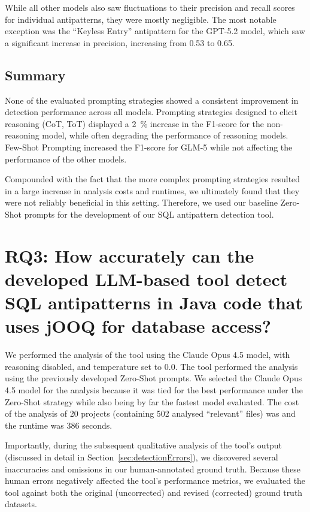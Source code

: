 While all other models also saw fluctuations to their precision and recall scores for individual antipatterns, they were mostly negligible. The most notable exception was the “Keyless Entry” antipattern for the GPT-5.2 model, which saw a significant increase in precision, increasing from \num{0.53} to \num{0.65}.

\subsection{Summary}

None of the evaluated prompting strategies showed a consistent improvement in detection performance across all models. Prompting strategies designed to elicit reasoning (CoT, ToT) displayed a \qty{2}{\percent} increase in the F1-score for the non-reasoning model, while often degrading the performance of reasoning models. Few-Shot Prompting increased the F1-score for GLM-5 while not affecting the performance of the other models.

Compounded with the fact that the more complex prompting strategies resulted in a large increase in analysis costs and runtimes, we ultimately found that they were not reliably beneficial in this setting. Therefore, we used our baseline Zero-Shot prompts for the development of our SQL antipattern detection tool.

\section{RQ3: How accurately can the developed LLM-based tool detect SQL antipatterns in Java code that uses jOOQ for database access?}\label{sec:resultsRQ3}

We performed the analysis of the tool using the Claude Opus 4.5 model, with reasoning disabled, and temperature set to \num{0.0}. The tool performed the analysis using the previously developed Zero-Shot prompts. We selected the Claude Opus 4.5 model for the analysis because it was tied for the best performance under the Zero-Shot strategy while also being by far the fastest model evaluated. The cost of the analysis of \num{20} projects (containing \num{502} analysed “relevant” files) was  and the runtime was \num{386} seconds.

Importantly, during the subsequent qualitative analysis of the tool's output (discussed in detail in Section~\ref{sec:detectionErrors}), we discovered several inaccuracies and omissions in our human-annotated ground truth. Because these human errors negatively affected the tool’s performance metrics, we evaluated the tool against both the original (uncorrected) and revised (corrected) ground truth datasets.


